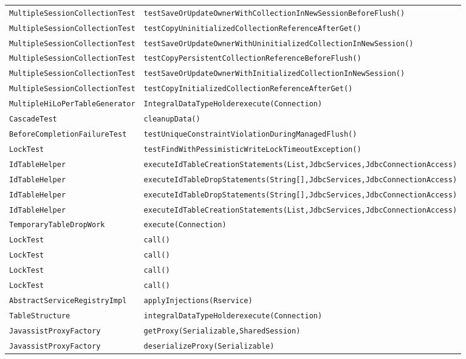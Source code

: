 \begin{center}
\begin{longtable}{ll}
\lstinline/MultipleSessionCollectionTest/&{\lstinline/testSaveOrUpdateOwnerWithCollectionInNewSessionBeforeFlush()/}\\
\lstinline/MultipleSessionCollectionTest/&{\lstinline/testCopyUninitializedCollectionReferenceAfterGet()/}\\
\lstinline/MultipleSessionCollectionTest/&{\lstinline/testSaveOrUpdateOwnerWithUninitializedCollectionInNewSession()/}\\
\lstinline/MultipleSessionCollectionTest/&{\lstinline/testCopyPersistentCollectionReferenceBeforeFlush()/}\\
\lstinline/MultipleSessionCollectionTest/&{\lstinline/testSaveOrUpdateOwnerWithInitializedCollectionInNewSession()/}\\
\lstinline/MultipleSessionCollectionTest/&{\lstinline/testCopyInitializedCollectionReferenceAfterGet()/}\\
\lstinline/MultipleHiLoPerTableGenerator/&{\lstinline/IntegralDataTypeHolderexecute(Connection)/}\\
\lstinline/CascadeTest/&{\lstinline/cleanupData()/}\\
\lstinline/BeforeCompletionFailureTest/&{\lstinline/testUniqueConstraintViolationDuringManagedFlush()/}\\
\lstinline/LockTest/&{\lstinline/testFindWithPessimisticWriteLockTimeoutException()/}\\
\lstinline/IdTableHelper/&{\lstinline/executeIdTableCreationStatements(List,JdbcServices,JdbcConnectionAccess)/}\\
\lstinline/IdTableHelper/&{\lstinline/executeIdTableDropStatements(String[],JdbcServices,JdbcConnectionAccess)/}\\
\lstinline/IdTableHelper/&{\lstinline/executeIdTableDropStatements(String[],JdbcServices,JdbcConnectionAccess)/}\\
\lstinline/IdTableHelper/&{\lstinline/executeIdTableCreationStatements(List,JdbcServices,JdbcConnectionAccess)/}\\
\lstinline/TemporaryTableDropWork/&{\lstinline/execute(Connection)/}\\
\lstinline/LockTest/&{\lstinline/call()/}\\
\lstinline/LockTest/&{\lstinline/call()/}\\
\lstinline/LockTest/&{\lstinline/call()/}\\
\lstinline/LockTest/&{\lstinline/call()/}\\
\lstinline/AbstractServiceRegistryImpl/&{\lstinline/applyInjections(Rservice)/}\\
\lstinline/TableStructure/&{\lstinline/integralDataTypeHolderexecute(Connection)/}\\
\lstinline/JavassistProxyFactory/&{\lstinline/getProxy(Serializable,SharedSession)/}\\
\lstinline/JavassistProxyFactory/&{\lstinline/deserializeProxy(Serializable)/}\\
\end{longtable}
\end{center}


